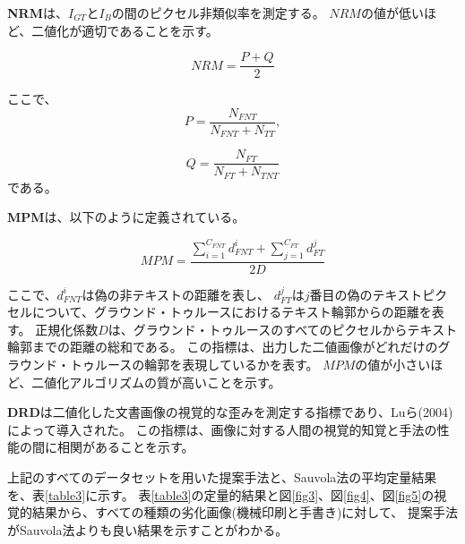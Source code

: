 \documentclass[uplatex, twocolumn,10pt]{jsarticle}
\begin{document}
\textbf{NRM}は、$I_{GT}$と$I_B$の間のピクセル非類似率を測定する。
$NRM$の値が低いほど、二値化が適切であることを示す。

\begin{equation}\label{eq6}
    NRM = \frac{P + Q}{2}
\end{equation}

ここで、
\begin{equation}\label{eq7}
    P = \frac{N_{FNT}}{N_{FNT} + N_{TT}},
\end{equation}

\begin{equation}\label{eq8}
    Q = \frac{N_{FT}}{N_{FT} + N_{TNT}}
\end{equation}
である。

\textbf{MPM}は、以下のように定義されている。

\begin{equation}\label{eq9}
    MPM = \frac{ \sum_{i=1}^{C_{FNT}} d_{FNT}^i + \sum_{j=1}^{C_{FT}} d_{FT}^j }{2D}
\end{equation}

ここで、$d_{FNT}^i$は偽の非テキストの距離を表し、
$d_{FT}^j$は$j$番目の偽のテキストピクセルについて、グラウンド・トゥルースにおけるテキスト輪郭からの距離を表す。
正規化係数$D$は、グラウンド・トゥルースのすべてのピクセルからテキスト輪郭までの距離の総和である。
この指標は、出力した二値画像がどれだけのグラウンド・トゥルースの輪郭を表現しているかを表す。
$MPM$の値が小さいほど、二値化アルゴリズムの質が高いことを示す。

\textbf{DRD}は二値化した文書画像の視覚的な歪みを測定する指標であり、Luら(2004)によって導入された。
この指標は、画像に対する人間の視覚的知覚と手法の性能の間に相関があることを示す。

上記のすべてのデータセットを用いた提案手法と、Sauvola法の平均定量結果を、表\ref{table3}に示す。
表\ref{table3}の定量的結果と図\ref{fig3}、図\ref{fig4}、図\ref{fig5}の視覚的結果から、すべての種類の劣化画像(機械印刷と手書き)に対して、
提案手法がSauvola法よりも良い結果を示すことがわかる。
\end{document}
